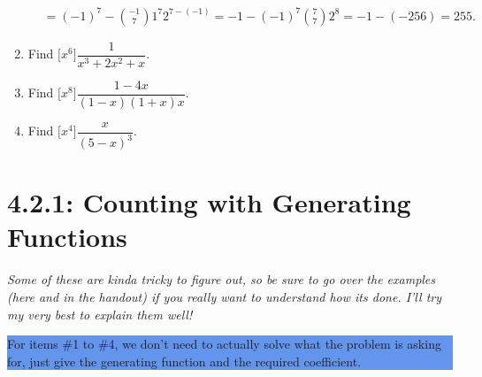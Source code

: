 \documentclass{article}
\begin{document}
\begin{enumerate}
\begin{align*}
        &= {(-1)}^7 - \binom{-1}{7} 1^7 2^{7-(-1)} = -1 - {(-1)}^7 \binom{7}{7} 2^8 = -1 -(-256) = 255. \tag*{$\blacksquare$}
    \end{align*} 
    \item Find $\big[x^6\big] \dfrac{1}{x^3 + 2x^2 + x}$. 
    \item Find $\big[x^8\big] \dfrac{1-4x}{(1-x)(1+x)x}$. 
    \item Find $\big[x^4\big] \dfrac{x}{{(5-x)}^3}$.
\end{enumerate}

\pagebreak
\section*{4.2.1: Counting with Generating Functions} 
\textit{Some of these are kinda tricky to figure out, so be sure to go over the examples (here and in the handout) if you really want to understand how its done. I'll 
try my very best to explain them well!}\par
\parindent=25pt
    \colorbox{CornflowerBlue}{
    \begin{minipage}[c]{0.9\textwidth}
        \centering
        For items \#1 to \#4, we don't need to actually solve what the problem is asking for, just give the generating function and the required coefficient.
    \end{minipage}
    }
\end{document}
